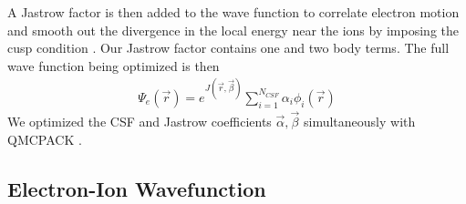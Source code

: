 \documentclass[pra,superscriptaddress,groupedaddress,twocolumn]{revtex4}
\begin{document}
A Jastrow factor is then added to the wave function to correlate electron motion and smooth out the divergence in the local energy near the ions by imposing the cusp condition \cite{Kato}. Our Jastrow factor contains one and two body terms.  %
The full wave function being optimized is then
\begin{align}
\Psi_e(\vec{r})=e^{J(\vec{r},\vec{\beta})}\sum\limits_{i=1}^{N_{CSF}}\alpha_i\phi_i(\vec{r})\label{eq:psie}
\end{align}
We optimized the CSF and Jastrow coefficients $\vec{\alpha},\vec{\beta}$ simultaneously with QMCPACK \cite{QMCPACK}.

\subsection{Electron-Ion Wavefunction}
\end{document}
